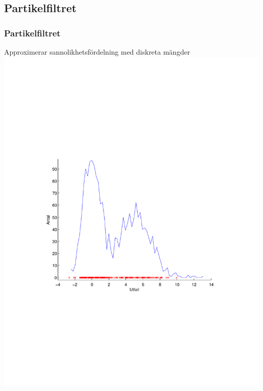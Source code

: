 \documentclass[]{beamer}
\renewcommand{\ae}{\"{a}}
\renewcommand{\oe}{\"{o}}
\begin{document}
\subsection{Partikelfiltret}

\begin{frame}
  \frametitle{Partikelfiltret}
  \begin{center}
    Approximerar sannolikhetsf\oe rdelning med diskreta m\ae ngder
    \includegraphics[trim=3cm 8cm 4cm 8cm, clip=true, totalheight=0.7\textheight]{hist.pdf}
  \end{center}
\end{frame}
\end{document}
